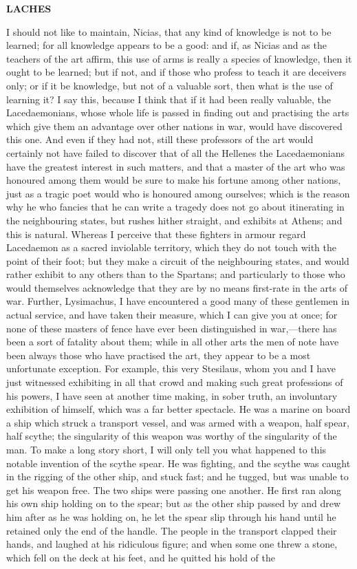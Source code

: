 \documentclass[11pt,letter]{book}
\begin{document}
\par \textbf{LACHES}
\par   I should not like to maintain, Nicias, that any kind of knowledge is not to be learned; for all knowledge appears to be a good:  and if, as Nicias and as the teachers of the art affirm, this use of arms is really a species of knowledge, then it ought to be learned; but if not, and if those who profess to teach it are deceivers only; or if it be knowledge, but not of a valuable sort, then what is the use of learning it? I say this, because I think that if it had been really valuable, the Lacedaemonians, whose whole life is passed in finding out and practising the arts which give them an advantage over other nations in war, would have discovered this one. And even if they had not, still these professors of the art would certainly not have failed to discover that of all the Hellenes the Lacedaemonians have the greatest interest in such matters, and that a master of the art who was honoured among them would be sure to make his fortune among other nations, just as a tragic poet would who is honoured among ourselves; which is the reason why he who fancies that he can write a tragedy does not go about itinerating in the neighbouring states, but rushes hither straight, and exhibits at Athens; and this is natural. Whereas I perceive that these fighters in armour regard Lacedaemon as a sacred inviolable territory, which they do not touch with the point of their foot; but they make a circuit of the neighbouring states, and would rather exhibit to any others than to the Spartans; and particularly to those who would themselves acknowledge that they are by no means first-rate in the arts of war. Further, Lysimachus, I have encountered a good many of these gentlemen in actual service, and have taken their measure, which I can give you at once; for none of these masters of fence have ever been distinguished in war,—there has been a sort of fatality about them; while in all other arts the men of note have been always those who have practised the art, they appear to be a most unfortunate exception. For example, this very Stesilaus, whom you and I have just witnessed exhibiting in all that crowd and making such great professions of his powers, I have seen at another time making, in sober truth, an involuntary exhibition of himself, which was a far better spectacle. He was a marine on board a ship which struck a transport vessel, and was armed with a weapon, half spear, half scythe; the singularity of this weapon was worthy of the singularity of the man. To make a long story short, I will only tell you what happened to this notable invention of the scythe spear. He was fighting, and the scythe was caught in the rigging of the other ship, and stuck fast; and he tugged, but was unable to get his weapon free. The two ships were passing one another. He first ran along his own ship holding on to the spear; but as the other ship passed by and drew him after as he was holding on, he let the spear slip through his hand until he retained only the end of the handle. The people in the transport clapped their hands, and laughed at his ridiculous figure; and when some one threw a stone, which fell on the deck at his feet, and he quitted his hold of the 
\end{document}
